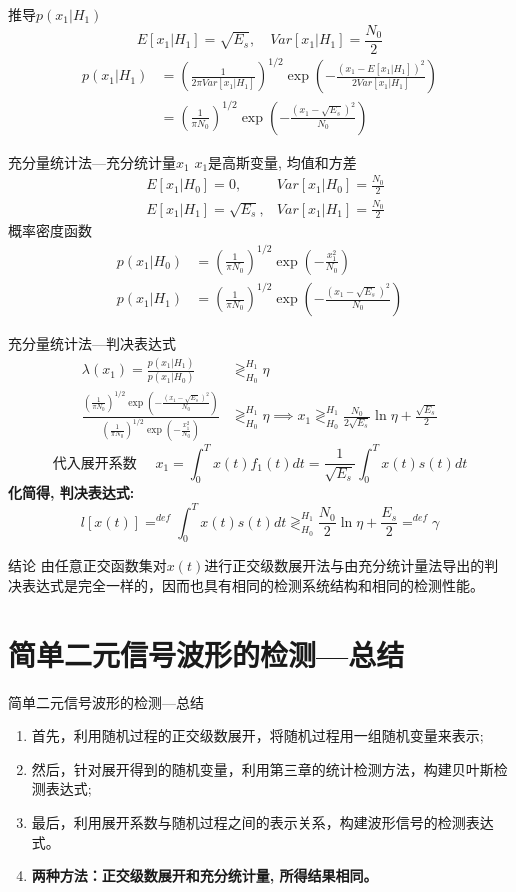 \begin{frame}{推导$p(x_1|H_1)$}
\[ E[x_1|H_1]=\sqrt{E_s},\quad Var[x_1|H_1]=\frac{N_0}{2}\]
\begin{align*}
p(x_1|H_1)&=\left(\frac{1}{2\pi Var[x_1|H_1]}\right)^{1/2}\exp\left(-\frac{(x_1-E[x_1|H_1])^2}{2Var[x_1|H_1]}\right)\\
&=\left(\frac{1}{\pi N_0}\right)^{1/2}\exp\left(-\frac{(x_1-\sqrt{E_s})^2}{N_0}\right)
\end{align*}
\end{frame}

\begin{frame}{充分量统计法---充分统计量$x_1$}
$x_1$是高斯变量, 均值和方差
\begin{align*}
&E[x_1|H_0]=0,&Var[x_1|H_0]=\frac{N_0}{2}\\
&E[x_1|H_1]=\sqrt{E_s},&Var[x_1|H_1]=\frac{N_0}{2}
\end{align*}
概率密度函数
\begin{align*}
p(x_1|H_0)&=\left(\frac{1}{\pi N_0}\right)^{1/2}\exp\left(-\frac{x_1^2}{N_0}\right)\\
p(x_1|H_1)&=\left(\frac{1}{\pi N_0}\right)^{1/2}\exp\left(-\frac{(x_1-\sqrt{E_s})^2}{N_0}\right)
\end{align*}
\end{frame}

\begin{frame}[shrink]{充分量统计法---判决表达式}
\begin{align*}
\lambda(x_1)=\frac{p(x_1|H_1)}{p(x_1|H_0)}&\mathop{\gtrless}_{H_0}^{H_1}\eta\\
\frac{\left(\frac{1}{\pi N_0}\right)^{1/2}\exp\left(-\frac{(x_1-\sqrt{E_s})^2}{N_0}\right)}{\left(\frac{1}{\pi N_0}\right)^{1/2}\exp\left(-\frac{x_1^2}{N_0}\right)}&\mathop{\gtrless}_{H_0}^{H_1}\eta\implies x_1\mathop{\gtrless}_{H_0}^{H_1}\frac{N_0}{2\sqrt{E_s}}\ln\eta+\frac{\sqrt{E_s}}{2}
\end{align*}
\[\text{代入展开系数 }\quad x_1=\int_{0}^{T}x(t)f_1(t)dt=\frac{1}{\sqrt{E_s}}\int_{0}^{T}x(t)s(t)dt \]
\textbf{化简得, 判决表达式:}
\[l[x(t)]\mathop{=}^{def}\int_{0}^{T}x(t)s(t)dt\mathop{\gtrless}_{H_0}^{H_1}\frac{N_0}{2}\ln\eta+\frac{E_s}{2}\mathop{=}^{def}\gamma \]
\begin{block}{结论}
	由任意正交函数集对$x(t)$进行正交级数展开法与由充分统计量法导出的判决表达式是完全一样的，因而也具有相同的检测系统结构和相同的检测性能。
\end{block}
\end{frame}

\section{简单二元信号波形的检测---总结}

\begin{frame}{简单二元信号波形的检测---总结}
\begin{enumerate}
	\setlength{\itemsep}{.5cm}
	\item 首先，利用随机过程的正交级数展开，将随机过程用一组随机变量来表示;
	\item 然后，针对展开得到的随机变量，利用第三章的统计检测方法，构建贝叶斯检测表达式;
	\item 最后，利用展开系数与随机过程之间的表示关系，构建波形信号的检测表达式。
	\item \textbf{两种方法：正交级数展开和充分统计量, 所得结果相同。}
\end{enumerate}
\end{frame}
